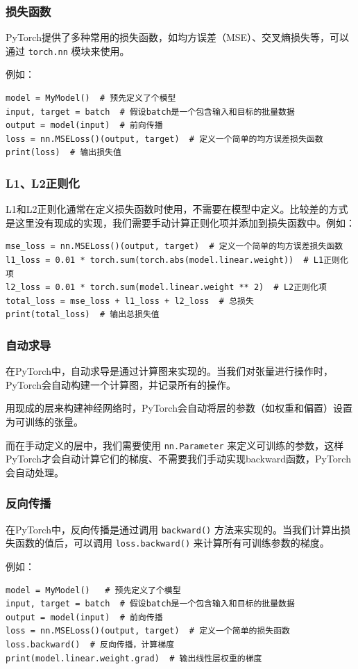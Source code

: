 \documentclass{ctexbeamer}
\begin{document}
\begin{frame}[fragile]
    \frametitle{损失函数}

    PyTorch提供了多种常用的损失函数，如均方误差（MSE）、交叉熵损失等，可以通过 \texttt{torch.nn} 模块来使用。

    例如：
    \begin{verbatim}
model = MyModel()  # 预先定义了个模型
input, target = batch  # 假设batch是一个包含输入和目标的批量数据
output = model(input)  # 前向传播
loss = nn.MSELoss()(output, target)  # 定义一个简单的均方误差损失函数
print(loss)  # 输出损失值
    \end{verbatim}

\end{frame}

\begin{frame}[fragile]
    \frametitle{L1、L2正则化}
    L1和L2正则化通常在定义损失函数时使用，不需要在模型中定义。比较差的方式是这里没有现成的实现，我们需要手动计算正则化项并添加到损失函数中。例如：
    \begin{verbatim}
mse_loss = nn.MSELoss()(output, target)  # 定义一个简单的均方误差损失函数
l1_loss = 0.01 * torch.sum(torch.abs(model.linear.weight))  # L1正则化项
l2_loss = 0.01 * torch.sum(model.linear.weight ** 2)  # L2正则化项
total_loss = mse_loss + l1_loss + l2_loss  # 总损失
print(total_loss)  # 输出总损失值
    \end{verbatim}
\end{frame}

\begin{frame}[fragile]
    \frametitle{自动求导}

    在PyTorch中，自动求导是通过计算图来实现的。当我们对张量进行操作时，PyTorch会自动构建一个计算图，并记录所有的操作。

    用现成的层来构建神经网络时，PyTorch会自动将层的参数（如权重和偏置）设置为可训练的张量。

    而在手动定义的层中，我们需要使用 \texttt{nn.Parameter} 来定义可训练的参数，这样PyTorch才会自动计算它们的梯度、不需要我们手动实现backward函数，PyTorch会自动处理。

\end{frame}

\begin{frame}[fragile]
    \frametitle{反向传播}

    在PyTorch中，反向传播是通过调用 \texttt{backward()} 方法来实现的。当我们计算出损失函数的值后，可以调用 \texttt{loss.backward()} 来计算所有可训练参数的梯度。

    例如：
    \begin{verbatim}
model = MyModel()   # 预先定义了个模型
input, target = batch  # 假设batch是一个包含输入和目标的批量数据
output = model(input)  # 前向传播
loss = nn.MSELoss()(output, target)  # 定义一个简单的损失函数
loss.backward()  # 反向传播，计算梯度
print(model.linear.weight.grad)  # 输出线性层权重的梯度
    \end{verbatim}

\end{frame}
\end{document}
